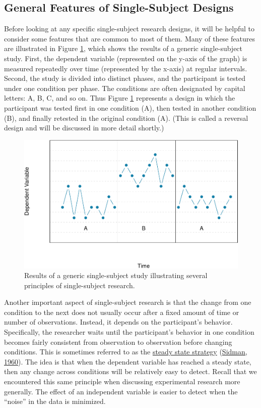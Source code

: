 \documentclass[
]{krantz}
\begin{document}
\hypertarget{general-features-of-single-subject-designs}{%
\subsection*{General Features of Single-Subject Designs}\label{general-features-of-single-subject-designs}}


Before looking at any specific single-subject research designs, it will be helpful to consider some features that are common to most of them. Many of these features are illustrated in Figure \ref{fig:aba}, which shows the results of a generic single-subject study. First, the dependent variable (represented on the y-axis of the graph) is measured repeatedly over time (represented by the x-axis) at regular intervals. Second, the study is divided into distinct phases, and the participant is tested under one condition per phase. The conditions are often designated by capital letters: A, B, C, and so on. Thus Figure \ref{fig:aba} represents a design in which the participant was tested first in one condition (A), then tested in another condition (B), and finally retested in the original condition (A). (This is called a reversal design and will be discussed in more detail shortly.)

\begin{figure}

{\centering \includegraphics[width=0.7\linewidth]{10-single-N_files/figure-latex/aba-1} 

}

\caption{Results of a generic single-subject study illustrating several principles of single-subject research.}\label{fig:aba}
\end{figure}

Another important aspect of single-subject research is that the change from one condition to the next does not usually occur after a fixed amount of time or number of observations. Instead, it depends on the participant's behavior. Specifically, the researcher waits until the participant's behavior in one condition becomes fairly consistent from observation to observation before changing conditions. This is sometimes referred to as the \protect\hyperlink{steady-state-strategy}{steady state strategy} (\protect\hyperlink{ref-sidman1960tactics}{Sidman, 1960}). The idea is that when the dependent variable has reached a steady state, then any change across conditions will be relatively easy to detect. Recall that we encountered this same principle when discussing experimental research more generally. The effect of an independent variable is easier to detect when the ``noise'' in the data is minimized.
\end{document}
